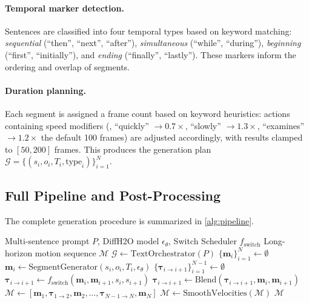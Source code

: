 \documentclass[runningheads]{llncs}
\newcommand{\bm}{\mathbf{m}}
\newcommand{\btau}{\boldsymbol{\tau}}
\begin{document}
\paragraph{Temporal marker detection.}
Sentences are classified into four temporal types based on keyword matching: \emph{sequential} (``then'', ``next'', ``after''), \emph{simultaneous} (``while'', ``during''), \emph{beginning} (``first'', ``initially''), and \emph{ending} (``finally'', ``lastly'').
These markers inform the ordering and overlap of segments.

\paragraph{Duration planning.}
Each segment is assigned a frame count based on keyword heuristics:
actions containing speed modifiers (\eg, ``quickly'' $\rightarrow 0.7\times$, ``slowly'' $\rightarrow 1.3\times$, ``examines'' $\rightarrow 1.2\times$ the default 100 frames) are adjusted accordingly, with results clamped to $[50, 200]$ frames.
This produces the generation plan $\mathcal{G} = \{(s_i, o_i, T_i, \text{type}_i)\}_{i=1}^N$.


\subsection{Full Pipeline and Post-Processing}
\label{sec:pipeline}

The complete generation procedure is summarized in \cref{alg:pipeline}.

\begin{algorithm}[t]
\caption{Switch~\&~Stitch: Long-Horizon Hand-Object Motion Generation}
\label{alg:pipeline}
\begin{algorithmic}[1]
\REQUIRE Multi-sentence prompt $P$, DiffH2O model $\epsilon_\theta$, Switch Scheduler $f_\text{switch}$
\ENSURE Long-horizon motion sequence $\mathcal{M}$
\STATE $\mathcal{G} \leftarrow \text{TextOrchestrator}(P)$ \hfill {}
\STATE $\{\bm_i\}_{i=1}^{N} \leftarrow \emptyset$
    \STATE $\bm_i \leftarrow \text{SegmentGenerator}(s_i, o_i, T_i, \epsilon_\theta)$ \hfill {}
\ENDFOR
\STATE $\{\btau_{i \rightarrow i+1}\}_{i=1}^{N-1} \leftarrow \emptyset$
    \STATE $\btau_{i \rightarrow i+1} \leftarrow f_\text{switch}(\bm_i, \bm_{i+1}, s_i, s_{i+1})$ \hfill {}
    \STATE $\btau_{i \rightarrow i+1} \leftarrow \text{Blend}(\btau_{i \rightarrow i+1}, \bm_i, \bm_{i+1})$ \hfill {}
\ENDFOR
\STATE $\mathcal{M} \leftarrow [\bm_1, \btau_{1 \rightarrow 2}, \bm_2, \ldots, \btau_{N{-}1 \rightarrow N}, \bm_N]$ \hfill {}
\STATE $\mathcal{M} \leftarrow \text{SmoothVelocities}(\mathcal{M})$ \hfill {}
\RETURN $\mathcal{M}$
\end{algorithmic}
\end{algorithm}
\end{document}
